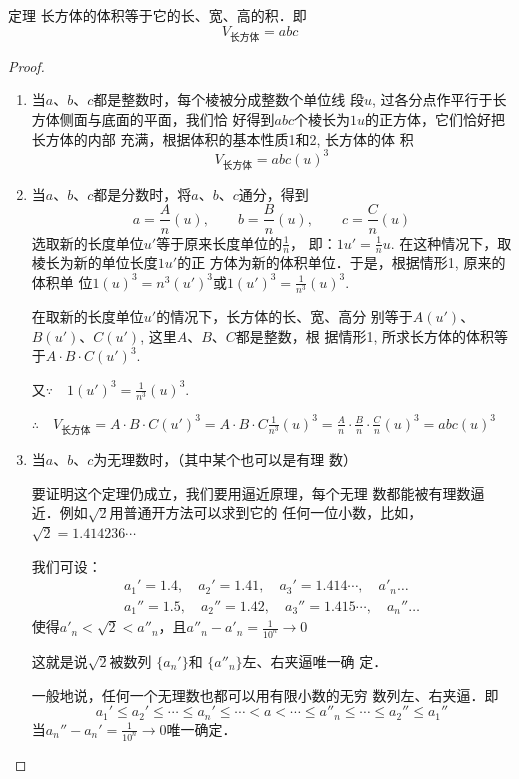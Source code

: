 \begin{blk}
   {定理} 长方体的体积等于它的长、宽、高的积．即
\[V_{\text{长方体}}=abc\] 
\end{blk}

\begin{proof}
\begin{enumerate}
    \item 当$a$、$b$、$c$都是整数时，每个棱被分成整数个单位线
段$u$, 过各分点作平行于长方体侧面与底面的平面，我们恰
好得到$abc$个棱长为$1u$的正方体，它们恰好把长方体的内部
充满，根据体积的基本性质1和2, 长方体的体
积
\[V_{\text{长方体}}=abc(u)^3\]
\item 当$a$、$b$、$c$都是分数时，将$a$、$b$、$c$通分，得到
\[a=\frac{A}{n}(u),\qquad b=\frac{B}{n}(u),\qquad c=\frac{C}{n}(u)\]
选取新的长度单位$u'$等于原来长度单位的$\frac{1}{n}$，
即：$1u'=\frac{1}{n}u$. 
在这种情况下，取棱长为新的单位长度$1u'$的正
方体为新的体积单位．于是，根据情形1, 原来的体积单
位$1(u)^3=n^3(u')^3$或$1(u')^3=\frac{1}{n^3}(u)^3$.

在取新的长度单位$u'$的情况下，长方体的长、宽、高分
别等于$A(u')$、$B(u')$、$C(u')$, 这里$A$、$B$、$C$都是整数，根
据情形1, 所求长方体的体积等于$A\cdot B\cdot C(u')^3$. 

又$\because\quad 1(u')^3=\frac{1}{n^3}(u)^3$. 

$\therefore\quad V_{\text{长方体}}=A\cdot B\cdot C(u')^3
=A\cdot B\cdot C\frac{1}{n^3}(u)^3=\frac{A}{n}\cdot \frac{B}{n}\cdot 
\frac{C}{n}(u)^3=abc(u)^3$

\item 当$a$、$b$、$c$为无理数时，（其中某个也可以是有理
数）

要证明这个定理仍成立，我们要用逼近原理，每个无理
数都能被有理数逼近．例如$\sqrt{2}$用普通开方法可以求到它的
任何一位小数，比如，
$\sqrt{2}=1.414236\cdots$

我们可设：
\[\begin{split}
    a_1'=1.4,\quad a_2'=1.41,\quad a_3'=1.414\cdots,\quad a'_n\ldots\\
a_1''=1.5,\quad a_2''=1.42,\quad a_3''=1.415\cdots,\quad a_n''\ldots
\end{split}\]
使得$a'_n<\sqrt{2}<a''_n$，且$a''_n-a'_n=\frac{1}{10^n}\to 0$

这就是说$\sqrt{2}$被数列 $\{a_n'\}$和 $\{a''_n\}$左、右夹逼唯一确
定．

一般地说，任何一个无理数也都可以用有限小数的无穷
数列左、右夹逼．即
\[a_1'\le a_2'\le \cdots\le a_n'\le \cdots<a<\cdots\le a''_n\le \cdots\le a_2''\le a_1''\]
当$a_n''-a_n'=\frac{1}{10^n}\to 0$唯一确定．


\end{enumerate}
\end{proof}
